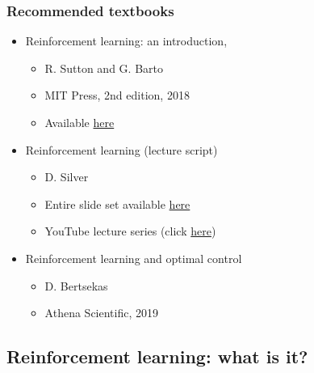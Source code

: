 \begin{frame}
	\frametitle{Recommended textbooks}
	\begin{itemize}
		\item Reinforcement learning: an introduction,
		      \begin{itemize}
			      \item R. Sutton and G. Barto
			      \item MIT Press, 2nd edition, 2018
			      \item Available \href{http://www.incompleteideas.net/book/the-book.html}{here}
		      \end{itemize}
		      \vspace{0.5cm}
		      \pause
		\item Reinforcement learning (lecture script)
		      \begin{itemize}
			      \item D. Silver
			      \item Entire slide set available \href{https://www.davidsilver.uk/teaching/}{here}
			      \item YouTube lecture series (click \href{https://www.youtube.com/watch?v=2pWv7GOvuf0}{here})
		      \end{itemize}
		      \vspace{0.5cm}
		      \pause
		\item Reinforcement learning and optimal control
		      \begin{itemize}
			      \item D. Bertsekas
			      \item Athena Scientific, 2019
		      \end{itemize}
	\end{itemize}
\end{frame}

\subsection{Reinforcement learning: what is it?}

